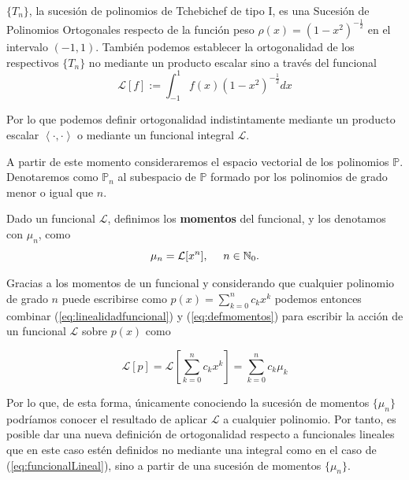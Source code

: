 \begin{ejemplo}
    $\{T_n\}$, la sucesión de polinomios de Tchebichef de tipo I, es una Sucesión de Polinomios Ortogonales respecto de la función peso $\rho(x)=(1-x^2)^{-\frac{1}{2}}$ en el intervalo $(-1,1)$. También podemos establecer la ortogonalidad de los respectivos $\{T_n\}$ no mediante un producto escalar sino a través del funcional
    \begin{equation}
        \label{eq:funcional-tchebichef}
        \mathcal{L}[f]:= \int_{-1}^1 f(x)(1-x^2)^{-\frac{1}{2}}dx
    \end{equation}
\end{ejemplo}

Por lo que podemos definir ortogonalidad indistintamente mediante un producto escalar $\left\langle\cdot,\cdot\right\rangle$ o mediante un funcional integral $\mathcal{L}$.

A partir de este momento consideraremos el espacio vectorial de los polinomios $\mathbb{P}$. Denotaremos como $\mathbb{P}_n$ al subespacio de $\mathbb{P}$ formado por los polinomios de grado menor o igual que $n$.


\begin{definicion}
    Dado un funcional $\mathcal{L}$, definimos los \textbf{momentos} del funcional, y los denotamos con $\mu_n$, como
    \begin{equation}
        \label{eq:defmomentos}
        \mu_n = \mathcal{L}[x^n], \ \ \ \ n\in\mathbb{N}_0.
    \end{equation}    
\end{definicion}

Gracias a los momentos de un funcional y considerando que cualquier polinomio de grado $n$ puede escribirse como $p(x)=\sum_{k=0}^n c_k x^k$ podemos entonces combinar (\ref{eq:linealidadfuncional}) y (\ref{eq:defmomentos}) para  escribir la acción de un funcional $\mathcal{L}$ sobre $p(x)$ como

$$
\mathcal{L}[p] = \mathcal{L}\left[ \sum_{k=0}^n c_k x^k \right] = \sum_{k=0}^n c_k \mu_k
$$

Por lo que, de esta forma, únicamente conociendo la sucesión de momentos $\{\mu_n\}$ podríamos conocer el resultado de aplicar $\mathcal{L}$ a cualquier polinomio. Por tanto, es posible dar una nueva definición de ortogonalidad respecto a funcionales lineales que en este caso estén definidos no mediante una integral como en el caso de (\ref{eq:funcionalLineal}), sino a partir de una sucesión de momentos $\{\mu_n\}$.

